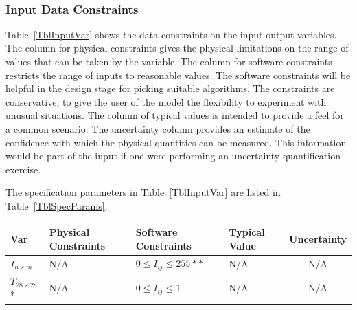 \documentclass[12pt]{article}
\begin{document}
~\newline



\subsubsection{Input Data Constraints} \label{sec_DataConstraints}    

Table~\ref{TblInputVar} shows the data constraints on the input output
variables.  The column for physical constraints gives the physical limitations
on the range of values that can be taken by the variable.  The column for
software constraints restricts the range of inputs to reasonable values.  The
software constraints will be helpful in the design stage for picking suitable
algorithms.  The constraints are conservative, to give the user of the model the
flexibility to experiment with unusual situations.  The column of typical values
is intended to provide a feel for a common scenario.  The uncertainty column
provides an estimate of the confidence with which the physical quantities can be
measured.  This information would be part of the input if one were performing an
uncertainty quantification exercise.

The specification parameters in Table~\ref{TblInputVar} are listed in
Table~\ref{TblSpecParams}.

\begin{table}[!h]
  \caption{Input Variables} \label{TblInputVar}
  \renewcommand{\arraystretch}{1.2}
\noindent \begin{longtable*}{l l l l c} 
  \toprule
  \textbf{Var} & \textbf{Physical Constraints} & \textbf{Software Constraints} &
                             \textbf{Typical Value} & \textbf{Uncertainty}\\
  \midrule 
  $I_{n \times m} $ & N/A & $0 \leq I_{ij} \leq 255**$ & N/A & N/A
  \\
  $T_{28 \times 28}$* & N/A & $0 \leq I_{ij} \leq 1$ & N/A & N/A
  \\
  \bottomrule
\end{longtable*}
\end{table}
\end{document}
